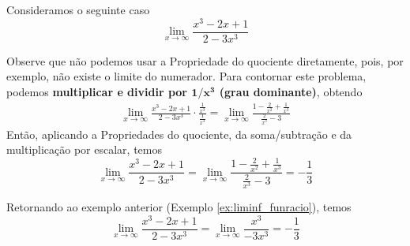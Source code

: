 \cleardoublepage\documentclass[../main.tex]{subfiles}
\begin{document}
\begin{ex}\label{ex:liminf_funracio}
  Consideramos o seguinte caso
  \begin{equation*}
    \lim_{x\to \infty} \frac{x^3 - 2x + 1}{2 - 3x^3}
  \end{equation*}
  \begin{solution}
       Observe que não podemos usar a Propriedade do quociente diretamente, pois, por exemplo, não existe o limite do numerador. Para contornar este problema, podemos \textbf{multiplicar e dividir por $\boldsymbol{1/x^3}$ (grau dominante)}, obtendo
  \begin{align*}
    \lim_{x\to\infty} \frac{x^3 - 2x + 1}{2 - 3x^3}\cdot\frac{\frac{1}{x^3}}{\frac{1}{x^3}} = \lim_{x\to\infty} \frac{1-\frac{2}{x^2} + \frac{1}{x^3}}{\frac{2}{x^3}-3}
  \end{align*}
  Então, aplicando a Propriedades do quociente, da soma/subtração e da multiplicação por escalar, temos
  \begin{equation*}
    \lim_{x\to\infty} \frac{x^3 - 2x + 1}{2 - 3x^3} = \lim_{x\to\infty} \frac{1-\frac{2}{x^2} + \frac{1}{x^3}}{\frac{2}{x^3}-3} = -\frac{1}{3}
  \end{equation*}
  \end{solution}
 \end{ex}


\begin{ex}
  Retornando ao exemplo anterior (Exemplo \ref{ex:liminf_funracio}), temos
  \begin{equation*}
    \lim_{x\to\infty} \frac{x^3 - 2x + 1}{2 - 3x^3} = \lim_{x\to\infty} \frac{x^3}{-3x^3} = -\frac{1}{3}
  \end{equation*}
\end{ex}

\end{document}
